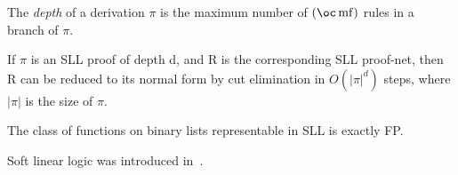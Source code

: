 The \emph{depth} of a derivation \(\pi\) is the maximum number of
\((\oc\rulename{mf})\) rules in a branch of \(\pi\).

\begin{theorem}
If $\pi$ is an SLL proof of depth d, and R is the corresponding SLL proof-net, then R can be reduced to its normal form by cut elimination in $O(|\pi|^d)$ steps, where $|\pi|$ is the size of $\pi$.
\end{theorem}

\begin{theorem}
The class of functions on binary lists representable in SLL is exactly FP.
\end{theorem}

Soft linear logic was introduced in~\cite{softlinearlogic}.


